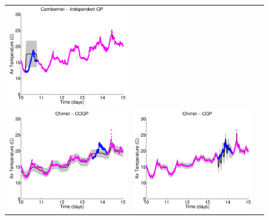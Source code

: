 \begin{figure}
\begin{tabular}{ccc}
\includegraphics[scale=0.3]{figures/weatherCambermet.eps}
\\
\includegraphics[scale=0.3]{figures/cogp-weatherChimet.eps} &
\includegraphics[scale=0.3]{figures/cgp-weatherChimet.eps} &

\end{tabular}
\end{figure}

